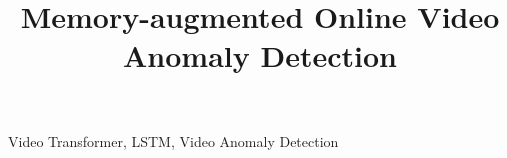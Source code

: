 \documentclass{article}
\title{Memory-augmented Online Video Anomaly Detection}
\providecommand{\mnote}[1]{\textcolor{violet}{\textbf{[MB: #1]}}}
\providecommand{\mnote}[1]{}
\begin{document}
%
\maketitle
%

\begin{abstract}
    
\end{abstract}
\begin{keywords}
    Video Transformer, LSTM, Video Anomaly Detection
\end{keywords}


%
%







{


%
}
\end{document}
